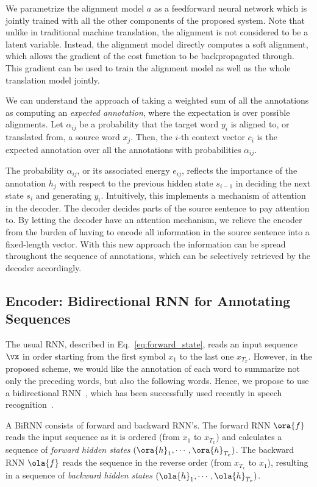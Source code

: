 We parametrize the alignment model $a$ as a feedforward neural network which is
jointly trained with all the other components of the proposed system.  Note
that unlike in traditional machine translation, the alignment is not considered
to be a latent variable. Instead, the alignment model directly computes a soft
alignment, which allows the gradient of the cost function to be backpropagated
through. This gradient can be used to train the alignment model as well as the
whole translation model jointly.

We can understand the approach of taking a weighted sum of all the annotations
as computing an {\em expected annotation}, where the expectation is over
possible alignments.  Let $\alpha_{ij}$ be a probability that the target word
$y_i$ is aligned to, or translated from, a source word $x_j$. Then, the $i$-th
context vector $c_i$ is the expected annotation over all the annotations with
probabilities $\alpha_{ij}$.

The probability $\alpha_{ij}$, or its associated energy $e_{ij}$, reflects the
importance of the annotation $h_j$ with respect to the previous hidden state
$s_{i-1}$ in deciding the next state $s_i$ and generating $y_i$.  Intuitively,
this implements a mechanism of attention in the decoder. The decoder decides
parts of the source sentence to pay attention to. By letting the decoder have an
attention mechanism, we relieve the encoder from the burden of having to encode
all information in the source sentence into a fixed-length vector. With this new
approach the information can be spread throughout the sequence of annotations,
which can be selectively retrieved by the decoder accordingly.

\subsection{Encoder: Bidirectional RNN for Annotating Sequences}
\label{sec:birnn_encoder}

The usual RNN, described in Eq.~\eqref{eq:forward_state}, reads an input
sequence $\vx$ in order starting from the first symbol $x_1$ to the last one
$x_{T_x}$. However, in the proposed scheme, we would like the annotation of each
word to summarize not only the preceding words, but also the following words.
Hence, we propose to use a bidirectional RNN~\citep[BiRNN, ][]{Schuster1997},
which has been successfully used recently in speech recognition~\citep[see,
e.g.,][]{Graves2013asru}. 

A BiRNN consists of forward and backward RNN's. The forward RNN $\ora{f}$ reads
the input sequence as it is ordered (from $x_1$ to $x_{T_x}$) and calculates a
sequence of {\it forward hidden states} $( \ora{h}_1, \cdots, \ora{h}_{T_x})$.
The backward RNN $\ola{f}$ reads the sequence in the reverse order (from
$x_{T_x}$ to $x_1$), resulting in a sequence of {\it backward hidden states} $(
\ola{h}_1, \cdots, \ola{h}_{T_x})$. 

